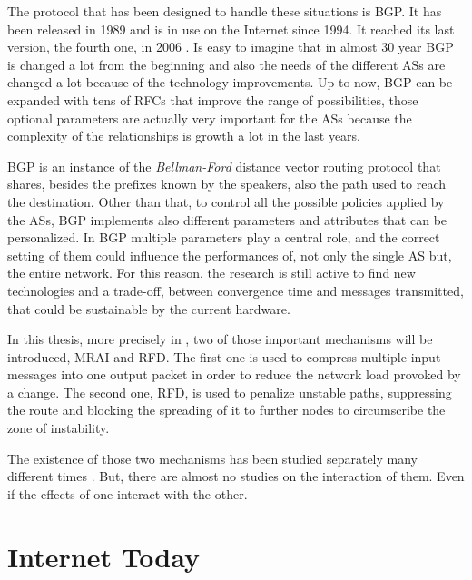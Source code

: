 The protocol that has been designed to handle these situations is  \ac{BGP}.
It has been released in \num{1989} and is in use on the Internet since \num{1994}.
It reached its last version, the fourth one, in \num{2006} \cite{rfc4271}.
Is easy to imagine that in almost \num{30} year \ac{BGP} is changed a lot from
the beginning and also the needs of the different \acp{AS} are changed a lot
because of the technology improvements.
Up to now, \ac{BGP} can be expanded with tens of \acp{RFC} that improve the
range of possibilities, those optional parameters are actually very important
for the \acp{AS} because the complexity of the relationships is growth a lot
in the last years.

\ac{BGP} is an instance of the \textit{Bellman-Ford} distance vector routing
protocol that shares, besides the prefixes known by the speakers, also the
path used to reach the destination.
Other than that, to control all the possible policies applied by the \acp{AS},
\ac{BGP} implements also different parameters and attributes that can be
personalized.
In \ac{BGP} multiple parameters play a central role, and the correct setting
of them could influence the performances of, not only the single \ac{AS} but,
the entire network.
For this reason, the research is still active to find new technologies and
a trade-off, between convergence time and messages transmitted, that could
be sustainable by the current hardware.

In this thesis, more precisely in , two of those important
mechanisms will be introduced, \ac{MRAI} and \ac{RFD}.
The first one is used to compress multiple input messages into one
output packet in order to reduce the network load provoked by a change.
The second one, \ac{RFD}, is used to penalize unstable paths, suppressing
the route and blocking the spreading of it to further nodes to circumscribe
the zone of instability.

The existence of those two mechanisms has been studied separately many different
times \cite{fabrikant2011there,daggitt2018rate,qiu2005optimal,gray2020bgp}.
But, there are almost no studies on the interaction of them.
Even if the effects of one interact with the other.

\section{Internet Today}
\label{sec:internet_today}

